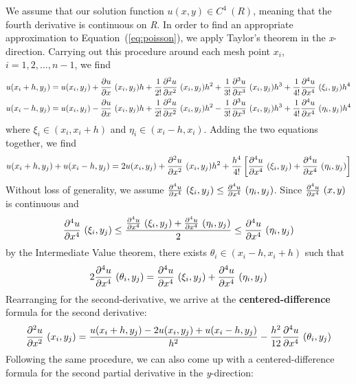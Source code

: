 \documentclass[12pt, titlepage]{article}
\begin{document}
    We assume that our solution function $u(x,y) \in C^4~(R)$, meaning that the fourth derivative is continuous on \textit{R}. In order to find an appropriate approximation to Equation~(\ref{eq:poisson}),
    we apply Taylor's theorem in the \textit{x}-direction. Carrying out this procedure around each mesh point $x_i$,\\
    $i=1,2,\dots,n-1$, we find
    \small
    \begin{align*}
        u(x_i + h, y_j) &= u(x_i, y_j) + \pdv{u}{x}~(x_i,y_j)h+\frac{1}{2!}\pdv[2]{u}{x}~(x_i,y_j)h^2+\frac{1}{3!}\pdv[3]{u}{x}~(x_i,y_j)h^3+\frac{1}{4!}\pdv[4]{u}{x}~(\xi_i,y_j)h^4\\
        u(x_i - h, y_j) &= u(x_i, y_j) - \pdv{u}{x}~(x_i,y_j)h+\frac{1}{2!}\pdv[2]{u}{x}~(x_i,y_j)h^2-\frac{1}{3!}\pdv[3]{u}{x}~(x_i,y_j)h^3+\frac{1}{4!}\pdv[4]{u}{x}~(\eta_i,y_j)h^4
    \end{align*}
    \normalsize
    where $\xi_i \in (x_i, x_i+h)$ and $\eta_i \in (x_i-h,x_i)$. Adding the two equations together, we find
    \small
    \begin{equation*}
        u(x_i + h, y_j) + u(x_i - h, y_j) = 2u(x_i, y_j) + \pdv[2]{u}{x}~(x_i, y_j)h^2 + \frac{h^4}{4!}\left[\pdv[4]{u}{x}~(\xi_i, y_j) + \pdv[4]{u}{x}~(\eta_i, y_j)\right]
    \end{equation*}
    \normalsize
    Without loss of generality, we assume $\pdv[4]{u}{x}~(\xi_i, y_j) \leq \pdv[4]{u}{x}~(\eta_i, y_j)$. Since $\pdv[4]{u}{x}~(x,y)$ is continuous and
    \begin{equation*}
        \pdv[4]{u}{x}~(\xi_i, y_j) \leq \frac{\pdv[4]{u}{x}~(\xi_i, y_j) + \pdv[4]{u}{x}~(\eta_i, y_j)}{2} \leq \pdv[4]{u}{x}~(\eta_i, y_j)
    \end{equation*}
    by the Intermediate Value theorem, there exists $\theta_i \in (x_i - h, x_i + h)$ such that
    \begin{equation*}
        2\pdv[4]{u}{x}~(\theta_i, y_j) = \pdv[4]{u}{x}~(\xi_i, y_j) + \pdv[4]{u}{x}~(\eta_i, y_j)
    \end{equation*}
    Rearranging for the second-derivative, we arrive at the \textbf{centered-difference} formula for the second derivative:
    \begin{equation}\label{eq:x_centered_diff}
        \pdv[2]{u}{x}~(x_i, y_j) = \frac{u(x_i + h, y_j) - 2u(x_i, y_j) + u(x_i - h, y_j)}{h^2} - \frac{h^2}{12}\pdv[4]{u}{x}~(\theta_i, y_j)
    \end{equation}
    Following the same procedure, we can also come up with a centered-difference formula for the second partial derivative in the \textit{y}-direction:
\end{document}
